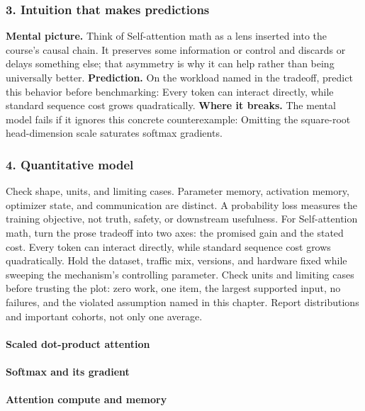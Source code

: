 \subsubsection*{3. Intuition that makes predictions}
\textbf{Mental picture.} Think of Self-attention math as a lens inserted into the course's causal chain. It preserves some information or control and discards or delays something else; that asymmetry is why it can help rather than being universally better.
\textbf{Prediction.} On the workload named in the tradeoff, predict this behavior before benchmarking: Every token can interact directly, while standard sequence cost grows quadratically.
\textbf{Where it breaks.} The mental model fails if it ignores this concrete counterexample: Omitting the square-root head-dimension scale saturates softmax gradients.
\subsubsection*{4. Quantitative model}
Check shape, units, and limiting cases. Parameter memory, activation memory, optimizer state, and communication are distinct. A probability loss measures the training objective, not truth, safety, or downstream usefulness.
For Self-attention math, turn the prose tradeoff into two axes: the promised gain and the stated cost. Every token can interact directly, while standard sequence cost grows quadratically. Hold the dataset, traffic mix, versions, and hardware fixed while sweeping the mechanism's controlling parameter.
Check units and limiting cases before trusting the plot: zero work, one item, the largest supported input, no failures, and the violated assumption named in this chapter. Report distributions and important cohorts, not only one average.
\paragraph{Scaled dot-product attention}
\paragraph{Softmax and its gradient}
\paragraph{Attention compute and memory}
